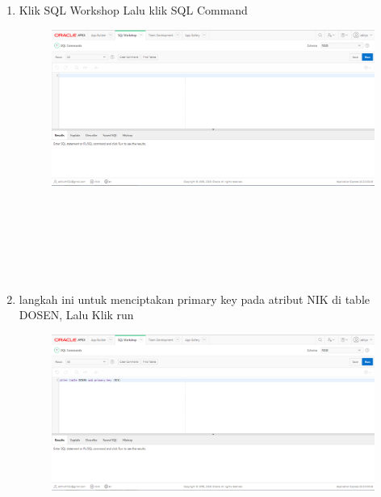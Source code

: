 \documentclass[12pt, times new roman, a4paper]{article}
\begin{document}
\begin{enumerate}
\item Klik SQL Workshop Lalu klik SQL Command
\begin{figure} [h]
	\centering
		\includegraphics[scale=0.3]{gambar/9}
\end{figure}
\\
\\
\\
\\
\\
\item langkah ini untuk menciptakan primary key pada atribut NIK di table DOSEN, Lalu Klik run
\begin{figure} [h]
	\centering
		\includegraphics[scale=0.4]{gambar/10}
\end{figure}


\end{enumerate}
\end{document}
